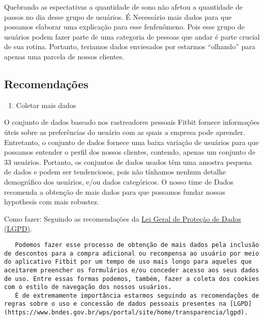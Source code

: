 \documentclass[11pt]{article}
\providecommand{\tightlist}{%
      \setlength{\itemsep}{0pt}\setlength{\parskip}{0pt}}
\begin{document}
Quebrando as espectativas a quantidade de sono não afetou a quantidade
de passos no dia desse grupo de usuários. É Necessário mais dados para
que possamos elaborar uma explicação para esse fenfenômeno. Pois esse
grupo de usuários podem fazer parte de uma categoria de pessoas que
andar é parte crucial de sua rotina. Portanto, teriamos dados enviesados
por estarmos ``olhando'' para apenas uma parcela de nossos clientes.

\hypertarget{recomendauxe7uxf5es}{%
    \subsection{Recomendações}\label{recomendauxe7uxf5es}}

\begin{enumerate}
    \def\labelenumi{\arabic{enumi}.}
    \tightlist
    \item
          Coletar mais dados
\end{enumerate}

O conjunto de dados baseado nos rastreadores pessoais Fitbit fornece
informações úteis sobre as preferências do usuário com as quais a
empresa pode aprender. Entretanto, o conjunto de dados fornece uma baixa
variação de usuários para que possamos entender o perfil dos nossos
clientes, contendo, apenas um conjunto de 33 usuários. Portanto, os
conjuntos de dados usados têm uma amostra pequena de dados e podem ser
tendenciosos, pois não tínhamos nenhum detalhe demográfico dos usuários,
e/ou dados categóricos. O nosso time de Dados recomenda a obtenção de
mais dados para que possamos fundar nossas hypothesis com mais robustez.

Como fazer: Seguindo as recomendações da
\href{https://www.bndes.gov.br/wps/portal/site/home/transparencia/lgpd}{Lei
    Geral de Proteção de Dados (LGPD)}.

\begin{verbatim}
   Podemos fazer esse processo de obtenção de mais dados pela inclusão de descontos para a compra adicional ou recompensa ao usuário por meio do aplicativo Fitbit por um tempo de uso mais longo para aqueles que aceitarem preencher os formulários e/ou conceder acesso aos seus dados de uso. Entre essas formas podemos, também, fazer a coleta dos cookies com o estilo de navegação dos nossos usuários.
   É de extremamente importância estarmos seguindo as recomendações de regras sobre o uso e concessão de dados pessoais presentes na [LGPD](https://www.bndes.gov.br/wps/portal/site/home/transparencia/lgpd).
\end{verbatim}


\end{document}
